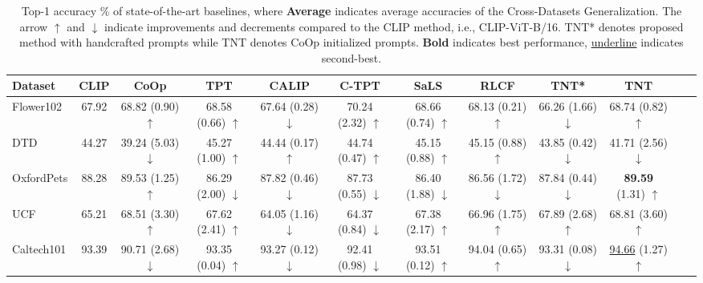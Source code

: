{\renewcommand{\arraystretch}{1.0}
\begin{table*}[h!]
\centering
\caption{Top-1 accuracy \% of state-of-the-art baselines, where \textbf{Average} indicates average accuracies of the Cross-Datasets Generalization. The arrow $\uparrow$ and $\downarrow$ indicate improvements and decrements compared to the CLIP method, i.e., CLIP-ViT-B/16. TNT* denotes proposed method with handcrafted prompts while TNT denotes CoOp initialized prompts. \textbf{Bold} indicates best performance, \underline{underline} indicates second-best.}
\setlength{\tabcolsep}{4pt}
\begin{tabular}{lccccccccccc}
\hline
\textbf{Dataset} & \textbf{CLIP} & \textbf{CoOp} & \textbf{TPT} & \textbf{CALIP} & \textbf{C-TPT} & \textbf{SaLS} & \textbf{RLCF} & \textbf{TNT*} & \textbf{TNT} \\
\hline
Flower102 & 67.92 & 68.82 {\scriptsize (0.90) $\uparrow$} & 68.58 {\scriptsize (0.66) $\uparrow$} & 67.64 {\scriptsize (0.28) $\downarrow$} & 70.24 {\scriptsize (2.32) $\uparrow$} & 68.66 {\scriptsize (0.74) $\uparrow$} & 68.13 {\scriptsize (0.21) $\uparrow$} & 66.26 {\scriptsize (1.66) $\downarrow$} & 68.74 {\scriptsize (0.82) $\uparrow$}  \\
DTD & 44.27 & 39.24 {\scriptsize (5.03) $\downarrow$} & 45.27 {\scriptsize (1.00) $\uparrow$} & 44.44 {\scriptsize (0.17) $\uparrow$} & 44.74 {\scriptsize (0.47) $\uparrow$} & 45.15 {\scriptsize (0.88) $\uparrow$} & 45.15 {\scriptsize (0.88) $\uparrow$} & 43.85 {\scriptsize (0.42) $\downarrow$} & 41.71 {\scriptsize (2.56) $\downarrow$}  \\
OxfordPets & 88.28 & 89.53 {\scriptsize (1.25) $\uparrow$} & 86.29 {\scriptsize (2.00) $\downarrow$} & 87.82 {\scriptsize (0.46) $\downarrow$} & 87.73 {\scriptsize (0.55) $\downarrow$} & 86.40 {\scriptsize (1.88) $\downarrow$} & 86.56 {\scriptsize (1.72) $\downarrow$} & 87.84 {\scriptsize (0.44) $\downarrow$} & \textbf{89.59} {\scriptsize (1.31) $\uparrow$}  \\
UCF & 65.21 & 68.51 {\scriptsize (3.30) $\uparrow$} & 67.62 {\scriptsize (2.41) $\uparrow$} & 64.05 {\scriptsize (1.16) $\downarrow$} & 64.37 {\scriptsize (0.84) $\downarrow$} & 67.38 {\scriptsize (2.17) $\uparrow$} & 66.96 {\scriptsize (1.75) $\uparrow$} & 67.89 {\scriptsize (2.68) $\uparrow$} & 68.81 {\scriptsize (3.60) $\uparrow$}  \\
Caltech101 & 93.39 & 90.71 {\scriptsize (2.68) $\downarrow$} & 93.35 {\scriptsize (0.04) $\uparrow$} & 93.27 {\scriptsize (0.12) $\downarrow$} & 92.41 {\scriptsize (0.98) $\downarrow$} & 93.51 {\scriptsize (0.12) $\uparrow$} & 94.04 {\scriptsize (0.65) $\uparrow$} & 93.31 {\scriptsize (0.08) $\downarrow$} & \underline{94.66} {\scriptsize (1.27) $\uparrow$}  \\

\end{tabular}
\end{table*}}
